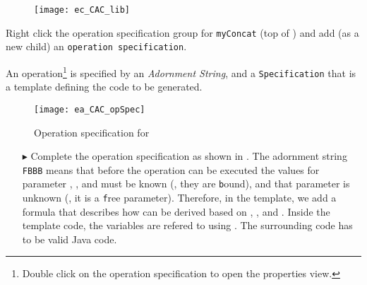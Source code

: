 \begin{stepbystep}
\begin{figure}[htbp]
\begin{center}
  \texttt{[image: ec\_CAC\_lib]}
  \caption{}  
  \label{ec_CAC_lib}
\end{center}
\end{figure}
\item
Right click the operation specification group for \texttt{myConcat} (top of ) and add (as a new child) an \texttt{operation specification}. 
\end{stepbystep}

An operation\footnote{Double click on the operation specification to open the properties view.} is specified by an \emph{Adornment String}, and a \texttt{Specification} that is a template defining the code to be generated.

\begin{figure}[htbp]
\begin{center}
  \texttt{[image: ea\_CAC\_opSpec]}
  \caption{Operation specification for }  
  \label{ea_CAC_opSpec}
\end{center}
\end{figure}

\begin{itemize}
\item[$\blacktriangleright$] Complete the operation specification as shown in . The adornment string \texttt{FBBB} means that before the operation can be executed the values for parameter , , and  must be known (\idest, they are \texttt{b}ound), and that parameter  is unknown (\idest, it is a \texttt{f}ree parameter).
Therefore, in the  template, we add a formula that describes how  can be derived based on , , and .
Inside the template code, the variables are refered to using \entity{\$}.
The surrounding code has to be valid Java code.
\end{itemize}

